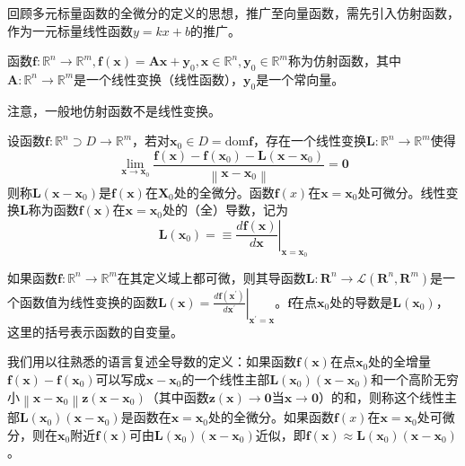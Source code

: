 \documentclass[main.tex]{subfiles}
\begin{document}
回顾多元标量函数的全微分的定义\cite[p.~19]{华工高数2009下}的思想，推广至向量函数，需先引入仿射函数，作为一元标量线性函数$y=kx+b$的推广。

\begin{definition}[仿射函数]
函数$\mathbf{f}:\mathbb{R}^n\rightarrow\mathbb{R}^m,\mathbf{f}\left(\mathbf{x}\right)=\mathbf{Ax}+\mathbf{y}_0,\mathbf{x}\in\mathbb{R}^n,\mathbf{y}_0\in\mathbb{R}^m$称为仿射函数，其中$\mathbf{A}:\mathbb{R}^n\rightarrow\mathbb{R}^m$是一个线性变换（线性函数），$\mathbf{y}_0$是一个常向量。
\end{definition}

注意，一般地仿射函数不是线性变换。

\begin{definition}[全微分与全导数]
设函数$\mathbf{f}:\mathbb{R}^n\supset D\rightarrow\mathbb{R}^m$，若对$\mathbf{x}_0\in D=\mathrm{dom}\mathbf{f}$，存在一个线性变换$\mathbf{L}:\mathbb{R}^n\rightarrow\mathbb{R}^m$使得
\[
\lim_{\mathbf{x}\to\mathbf{x}_0}\frac{\mathbf{f}\left(\mathbf{x}\right)-\mathbf{f}\left(\mathbf{x}_0\right)-\mathbf{L}\left(\mathbf{x}-\mathbf{x}_0\right)}{\left\|\mathbf{x}-\mathbf{x}_0\right\|}=\mathbf{0}
\]
则称$\mathbf{L}\left(\mathbf{x}-\mathbf{x}_0\right)$是$\mathbf{f}\left(\mathbf{x}\right)$在$\mathbf{X}_0$处的全微分。函数$\mathbf{f}\left(x\right)$在$\mathbf{x}=\mathbf{x}_0$处可微分。线性变换$\mathbf{L}$称为函数$\mathbf{f}\left(\mathbf{x}\right)$在$\mathbf{x}=\mathbf{x}_0$处的（全）导数，记为
\[\mathbf{L}\left(\mathbf{x}_0\right)=\equiv\left.\frac{d\mathbf{f}\left(\mathbf{x}\right)}{d\mathbf{x}}\right|_{\mathbf{x}=\mathbf{x}_0}
\]
\end{definition}

如果函数$\mathbf{f}:\mathbb{R}^n\rightarrow\mathbb{R}^m$在其定义域上都可微，则其导函数$\mathbf{L}:\mathbf{R}^n\rightarrow\mathcal{L}\left(\mathbf{R}^n,\mathbf{R}^m\right)$是一个函数值为线性变换的函数$\mathbf{L}\left(\mathbf{x}\right)=\left.\frac{d\mathbf{f}\left(\mathbf{x}^\prime\right)}{d\mathbf{x}^\prime}\right|_{\mathbf{x}^\prime=\mathbf{x}}$。$\mathbf{f}$在点$\mathbf{x}_0$处的导数是$\mathbf{L}\left(\mathbf{x}_0\right)$，这里的括号表示函数的自变量。

我们用以往熟悉的语言复述全导数的定义：如果函数$\mathbf{f}\left(\mathbf{x}\right)$在点$\mathbf{x}_0$处的全增量$\mathbf{f}\left(\mathbf{x}\right)-\mathbf{f}\left(\mathbf{x}_0\right)$可以写成$\mathbf{x}-\mathbf{x}_0$的一个线性主部$\mathbf{L}\left(\mathbf{x}_0\right)\left(\mathbf{x}-\mathbf{x}_0\right)$和一个高阶无穷小$\left\|\mathbf{x}-\mathbf{x}_0\right\|\mathbf{z}\left(\mathbf{x}-\mathbf{x}_0\right)$（其中函数$\mathbf{z}\left(\mathbf{x}\right)\to\mathbf{0}$当$\mathbf{x}\to\mathbf{0}$）的和，则称这个线性主部$\mathbf{L}\left(\mathbf{x}_0\right)\left(\mathbf{x}-\mathbf{x}_0\right)$是函数在$\mathbf{x}=\mathbf{x}_0$处的全微分。如果函数$\mathbf{f}\left(x\right)$在$\mathbf{x}=\mathbf{x}_0$处可微分，则在$\mathbf{x}_0$附近$\mathbf{f}\left(\mathbf{x}\right)$可由$\mathbf{L}\left(\mathbf{x}_0\right)\left(\mathbf{x}-\mathbf{x}_0\right)$近似，即$\mathbf{f}\left(\mathbf{x}\right)\approx\mathbf{L}\left(\mathbf{x}_0\right)\left(\mathbf{x}-\mathbf{x}_0\right)$。
\end{document}
